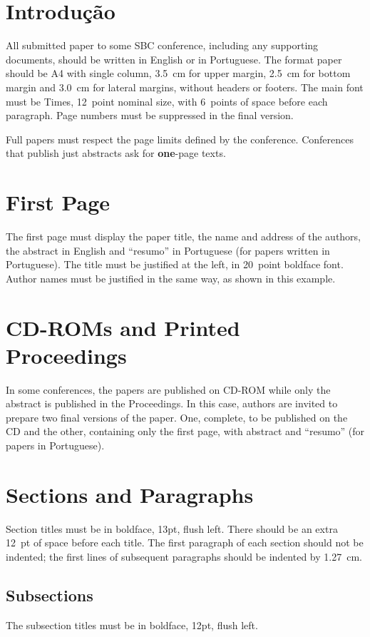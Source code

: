 \section{Introdução}
All submitted paper to some SBC conference, including any supporting
documents, should be written in English or in Portuguese. The format
paper should be A4 with single column, 3.5~cm for upper margin, 2.5~cm
for bottom margin and 3.0~cm for lateral margins, without headers or
footers. The main font must be Times, 12~point nominal size, with
6~points of space before each paragraph. Page numbers must be
suppressed in the final version.

Full papers must respect the page limits defined by the conference.
Conferences that publish just abstracts ask for \textbf{one}-page
texts.

\section{First Page}
The first page must display the paper title, the name and address of
the authors, the abstract in English and ``resumo'' in Portuguese (for
papers written in Portuguese). The title must be justified at the
left, in 20~point boldface font. Author names must be justified in the
same way, as shown in this example.

\section{CD-ROMs and Printed Proceedings}
In some conferences, the papers are published on CD-ROM while only the
abstract is published in the Proceedings. In this case, authors are
invited to prepare two final versions of the paper. One, complete, to
be published on the CD and the other, containing only the first page,
with abstract and ``resumo'' (for papers in Portuguese).

\section{Sections and Paragraphs}
Section titles must be in boldface, 13pt, flush left. There should be
an extra 12~pt of space before each title. The first paragraph of each
section should not be indented; the first lines of subsequent
paragraphs should be indented by 1.27~cm.

\subsection{Subsections}
The subsection titles must be in boldface, 12pt, flush left.


